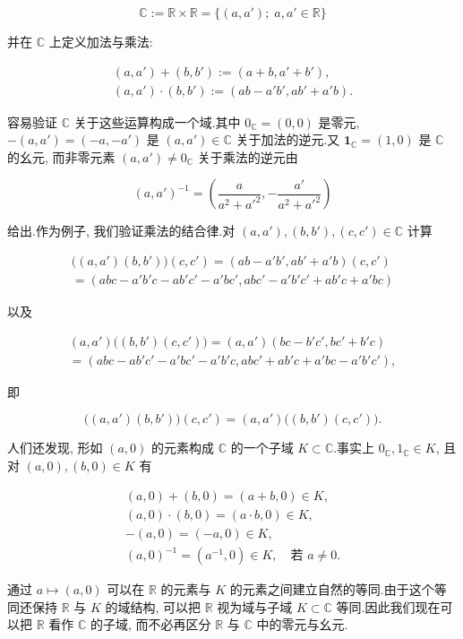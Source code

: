 \[
\mathbb{C} := \mathbb{R} \times \mathbb{R} = \{(a, a');\; a, a' \in \mathbb{R}\}
\]

并在 $\mathbb{C}$ 上定义加法与乘法:

\[
\begin{array}{c}
(a, a') + (b, b') := (a + b, a' + b'), \\
(a, a') \cdot (b, b') := (ab - a'b', ab' + a'b).
\end{array}
\]

容易验证 $\mathbb{C}$ 关于这些运算构成一个域.其中 $0_{\mathbb{C}} = (0, 0)$ 是零元, $-(a, a') = (-a, -a')$ 是 $(a, a') \in \mathbb{C}$ 关于加法的逆元.又 $\mathbf{1}_{\mathbb{C}} = (1, 0)$ 是 $\mathbb{C}$ 的幺元, 而非零元素 $(a, a') \neq 0_{\mathbb{C}}$ 关于乘法的逆元由

\[
(a, a')^{-1} = \left(\frac{a}{a^2 + a'^2}, -\frac{a'}{a^2 + a'^2}\right)
\]

给出.作为例子, 我们验证乘法的结合律.对 $(a, a'), (b, b'), (c, c') \in \mathbb{C}$ 计算

\[
\begin{array}{c}
\big((a, a')(b, b')\big)(c, c') = (ab - a'b', ab' + a'b)(c, c') \\
= (abc - a'b'c - ab'c' - a'bc', abc' - a'b'c' + ab'c + a'bc)
\end{array}
\]

以及

\[
\begin{array}{c}
(a, a')\big((b, b')(c, c')\big) = (a, a')(bc - b'c', bc' + b'c) \\
= (abc - ab'c' - a'bc' - a'b'c, abc' + ab'c + a'bc - a'b'c'),
\end{array}
\]

即

\[
\bigl((a, a')(b, b')\bigr)(c, c') = (a, a')\bigl((b, b')(c, c')\bigr).
\]

人们还发现, 形如 $(a, 0)$ 的元素构成 $\mathbb{C}$ 的一个子域 $K \subset \mathbb{C}$.事实上 $0_{\mathbb{C}}, 1_{\mathbb{C}} \in K$, 且对 $(a, 0), (b, 0) \in K$ 有

\[
\begin{array}{c}
(a, 0) + (b, 0) = (a + b, 0) \in K, \\
(a, 0) \cdot (b, 0) = (a \cdot b, 0) \in K, \\
-(a, 0) = (-a, 0) \in K, \\
(a, 0)^{-1} = (a^{-1}, 0) \in K, \quad \text{若 } a \neq 0\text{.}
\end{array}
\]

通过 $a \longmapsto (a, 0)$ 可以在 $\mathbb{R}$ 的元素与 $K$ 的元素之间建立自然的等同.由于这个等同还保持 $\mathbb{R}$ 与 $K$ 的域结构, 可以把 $\mathbb{R}$ 视为域与子域 $K \subset \mathbb{C}$ 等同.因此我们现在可以把 $\mathbb{R}$ 看作 $\mathbb{C}$ 的子域, 而不必再区分 $\mathbb{R}$ 与 $\mathbb{C}$ 中的零元与幺元.

